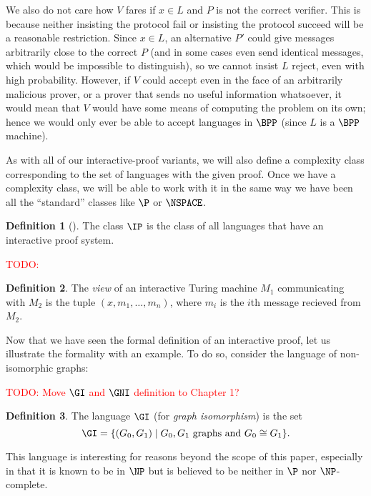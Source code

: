 \documentclass[english,12pt]{reedthesis}
\theoremstyle{plain}
\theoremstyle{definition}
\newtheorem{defn}[defn]{Definition}
\theoremstyle{remark}
\newcommand{\TODO}[1]{\textcolor{red}{TODO: #1}}
\begin{document}
We also do not care how $V$ fares if $x \in L$ and $P$ is not the correct
verifier. This is because neither insisting the protocol fail or insisting the
protocol succeed will be a reasonable restriction. Since $x \in L$, an alternative
$P'$ could give messages arbitrarily close to the correct $P$ (and in some cases
even send identical messages, which would be impossible to distinguish), so we
cannot insist $L$ reject, even with high probability. However, if $V$ could
accept even in the face of an arbitrarily malicious prover, or a prover that
sends no useful information whatsoever, it would mean that $V$ would have some
means of computing the problem on its own; hence we would only ever be able to
accept languages in $\BPP$ (since $L$ is a $\BPP$ machine).

As with all of our interactive-proof variants, we will also define a complexity
class corresponding to the set of languages with the given proof. Once we have a
complexity class, we will be able to work with it in the same way we have been
all the ``standard'' classes like $\P$ or $\NSPACE$.

\begin{defn}[{\cite[Def.\ 4.2.5]{Go01}}]\label{def:ip}
  The class $\IP$ is the class of all languages that have an interactive proof
  system.
\end{defn}

\TODO{}

\begin{defn}\label{def:view-ip}
  The \emph{view} of an interactive Turing machine $M_{1}$ communicating with
  $M_{2}$ is the tuple $(x, m_{1}, \ldots, m_{n})$, where $m_{i}$ is the $i$th
  message recieved from $M_{2}$.
\end{defn}

Now that we have seen the formal definition of an interactive proof, let us
illustrate the formality with an example. To do so, consider the language of
non-isomorphic graphs:

\TODO{Move $\GI$ and $\GNI$ definition to Chapter 1?}
\begin{defn}\label{def:gi}
  The language $\GI$ (for \emph{graph isomorphism}) is the set
  \[
    \GI = \{(G_{0}, G_{1}) \mid G_{0}, G_{1} \text{ graphs and } G_{0} \cong G_{1}\}.
  \]
\end{defn}

This language is interesting for reasons beyond the scope of this paper,
especially in that it is known to be in $\NP$ but is believed to be neither in
$\P$ nor $\NP$-complete.
\end{document}
